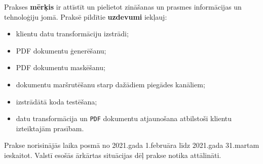 Prakses \textbf{mērķis} ir attīstīt un pielietot zināšanas un prasmes informācijas un tehnoloģiju jomā.
Praksē pildītie \textbf{uzdevumi} iekļauj:
\begin{itemize}
    \item klientu datu transformāciju izstrādi;
    \item PDF dokumentu ģenerēšanu;
    \item PDF dokumentu maskēšanu;
    \item dokumentu maršrutēšanu starp dažādiem piegādes kanāliem;
    \item izstrādātā koda testēšana;
    \item datu transformācija un \texttt{PDF} dokumentu atjaunošana atbilstoši klientu izteiktajām prasībam.
\end{itemize}
\par Prakse norisinājās laika posmā no 2021.gada 1.februāra līdz 2021.gada 31.martam ieskaitot. Valstī esošās ārkārtas situācijas dēļ prakse notika attālināti.